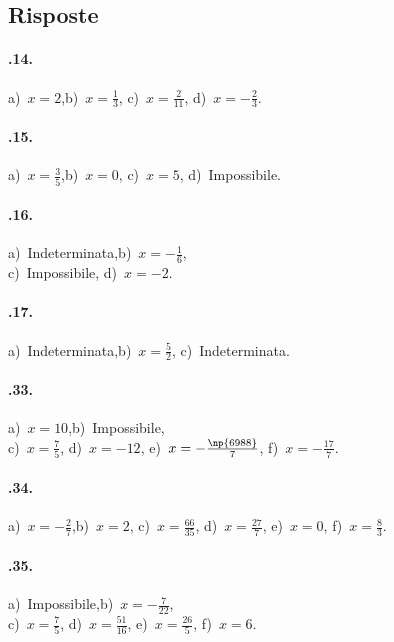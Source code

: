 \subsection{Risposte}
\begin{multicols}{2}
\paragraph{\thechapter.14.}
a)~$x=2$,\quad b)~$x=\frac{1}{3}$, \quad c)~$x=\frac{2}{11}$, \quad d)~$x=-\frac{2}{3}$.

\paragraph{\thechapter.15.}
a)~$x=\frac{3}{5}$,\quad b)~$x=0$, \quad c)~$x=5$, \quad d)~Impossibile.

\paragraph{\thechapter.16.}
a)~Indeterminata,\quad b)~$x=-\frac{1}{6}$, \protect\\ c)~Impossibile, \quad d)~$x=-2$.

\paragraph{\thechapter.17.}
a)~Indeterminata,\quad b)~$x=\frac{5}{2}$, \quad c)~Indeterminata.

\paragraph{\thechapter.33.}
a)~$x=10$,\quad b)~Impossibile, \protect\\ c)~$x=\frac{7}{5}$, \quad d)~$x=-12$, \quad e)~$x=-\frac{\np{6988}}{7}$, \quad f)~$x=-\frac{17}{7}$.

\paragraph{\thechapter.34.}
a)~$x=-{\frac{2}{7}}$,\quad b)~$x=2$, \quad c)~$x=\frac{66}{35}$, \quad d)~$x=\frac{27}{7}$, \quad e)~$x=0$, \quad f)~$x=\frac{8}{3}$.

\paragraph{\thechapter.35.}
a)~Impossibile,\quad b)~$x=-{\frac{7}{22}}$, \protect\\ c)~$x=\frac{7}{5}$, \quad d)~$x=\frac{51}{16}$, \quad e)~$x=\frac{26}{5}$, \quad f)~$x=6$.


\end{multicols}
